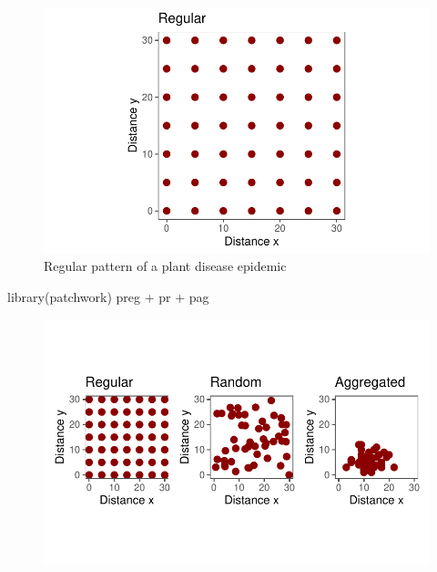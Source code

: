 \documentclass[
  letterpaper,
  DIV=11,
  numbers=noendperiod]{scrreprt}
\newenvironment{Shaded}{\begin{snugshade}}{\end{snugshade}}
\newcommand{\FunctionTok}[1]{\textcolor[rgb]{0.28,0.35,0.67}{#1}}
\newcommand{\NormalTok}[1]{\textcolor[rgb]{0.00,0.23,0.31}{#1}}
\newcommand{\SpecialCharTok}[1]{\textcolor[rgb]{0.37,0.37,0.37}{#1}}
\begin{document}
\begin{figure}[H]

{\centering \includegraphics{spatial-patterns_files/figure-pdf/fig-regular-1.pdf}

}

\caption{\label{fig-regular}Regular pattern of a plant disease epidemic}

\end{figure}

\begin{Shaded}
\begin{Highlighting}[]
\FunctionTok{library}\NormalTok{(patchwork)}
\NormalTok{preg }\SpecialCharTok{+}\NormalTok{ pr }\SpecialCharTok{+}\NormalTok{ pag}
\end{Highlighting}
\end{Shaded}

\begin{figure}[H]

{\centering \includegraphics{spatial-patterns_files/figure-pdf/unnamed-chunk-6-1.pdf}

}

\end{figure}
\end{document}
